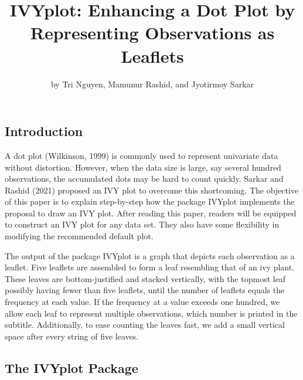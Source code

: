 \title{IVYplot: Enhancing a Dot Plot by Representing Observations as Leaflets}
\author{by Tri Nguyen, Mamunur Rashid, and Jyotirmoy Sarkar}

\maketitle


\hypertarget{introduction}{%
\subsection{Introduction}\label{introduction}}

A dot plot (Wilkinson, 1999) is commonly used to represent univariate
data without distortion. However, when the data size is large, say
several hundred observations, the accumulated dots may be hard to count
quickly. Sarkar and Rashid (2021) proposed an IVY plot to overcome this
shortcoming. The objective of this paper is to explain step-by-step how
the package IVYplot implements the proposal to draw an IVY plot. After
reading this paper, readers will be equipped to construct an IVY plot
for any data set. They also have some flexibility in modifying the
recommended default plot.

The output of the package IVYplot is a graph that depicts each
observation as a leaflet. Five leaflets are assembled to form a leaf
resembling that of an ivy plant. These leaves are bottom-justified and
stacked vertically, with the topmost leaf possibly having fewer than
five leaflets, until the number of leaflets equals the frequency at each
value. If the frequency at a value exceeds one hundred, we allow each
leaf to represent multiple observations, which number is printed in the
subtitle. Additionally, to ease counting the leaves fast, we add a small
vertical space after every string of five leaves.

\hypertarget{the-ivyplot-package}{%
\subsection{The IVYplot Package}\label{the-ivyplot-package}}

